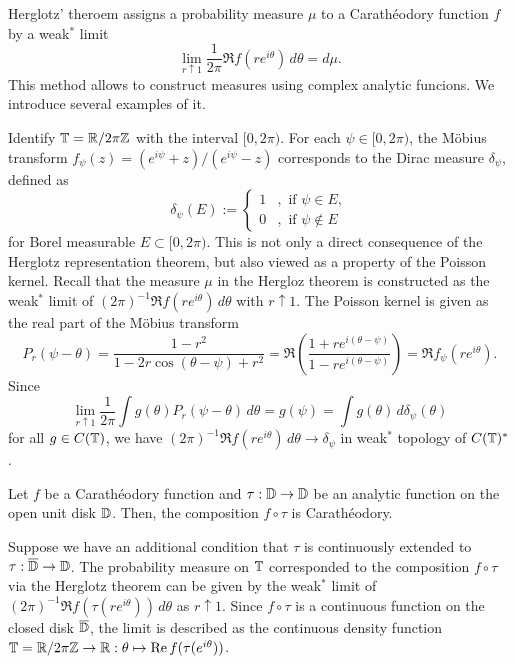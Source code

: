 \documentclass[a4paper]{article}
\begin{document}
Herglotz' theroem assigns a probability measure $\mu$ to a Carath\'eodory function $f$ by a weak$^*$ limit
\[\lim_{r\uparrow1}\frac1{2\pi}\Re f(re^{i\theta})\,d\theta=d\mu.\]
This method allows to construct measures using complex analytic funcions.
We introduce several examples of it.

\begin{ex}
Identify $\mathbb{T}=\mathbb{R}/2\pi\mathbb{Z}$ with the interval $[0,2\pi)$.
For each $\psi\in[0,2\pi)$, the M\"obius transform $f_\psi(z)=(e^{i\psi}+z)/(e^{i\psi}-z)$ corresponds to the Dirac measure $\delta_\psi$, defined as
\[\delta_\psi(E):=\begin{cases}1&,\text{ if }\psi\in E,\\0&,\text{ if }\psi\notin E\end{cases}\]
for Borel measurable $E\subset[0,2\pi)$.
This is not only a direct consequence of the Herglotz representation theorem, but also viewed as a property of the Poisson kernel.
Recall that the measure $\mu$ in the Hergloz theorem is constructed as the weak$^*$ limit of $(2\pi)^{-1}\Re f(re^{i\theta})\,d\theta$ with $r\uparrow1$.
The Poisson kernel is given as the real part of the M\"obius transform
\[P_r(\psi-\theta)=\frac{1-r^2}{1-2r\cos(\theta-\psi)+r^2}=\Re\left(\frac{1+re^{i(\theta-\psi)}}{1-re^{i(\theta-\psi)}}\right)=\Re f_\psi(re^{i\theta}).\]
Since
\[\lim_{r\uparrow1}\frac1{2\pi}\int g(\theta)P_r(\psi-\theta)\,d\theta=g(\psi)=\int g(\theta)\,d\delta_\psi(\theta)\]
for all $g\in C(\mathbb{T})$, we have $(2\pi)^{-1}\Re f(re^{i\theta})\,d\theta\to\delta_\psi$ in weak$^*$ topology of $C(\mathbb{T})^*$.
\end{ex}


\begin{ex}
Let $f$ be a Carath\'eodory function and $\tau:\mathbb{D}\to\mathbb{D}$ be an analytic function on the open unit disk $\mathbb{D}$.
Then, the composition $f\circ\tau$ is Carath\'eodory.

Suppose we have an additional condition that $\tau$ is continuously extended to $\tau:\overline{\mathbb{D}}\to\mathbb{D}$.
The probability measure on $\mathbb{T}$ corresponded to the composition $f\circ\tau$ via the Herglotz theorem can be given by the weak$^*$ limit of $(2\pi)^{-1}\Re f(\tau(re^{i\theta}))\,d\theta$ as $r\uparrow1$.
Since $f\circ\tau$ is a continuous function on the closed disk $\overline{\mathbb{D}}$, the limit is described as the continuous density function $\mathbb{T}=\mathbb{R}/2\pi\mathbb{Z}\to\mathbb{R}:\theta\mapsto\operatorname{Re} f(\tau(e^{i\theta}))$.
\end{ex}
\end{document}
